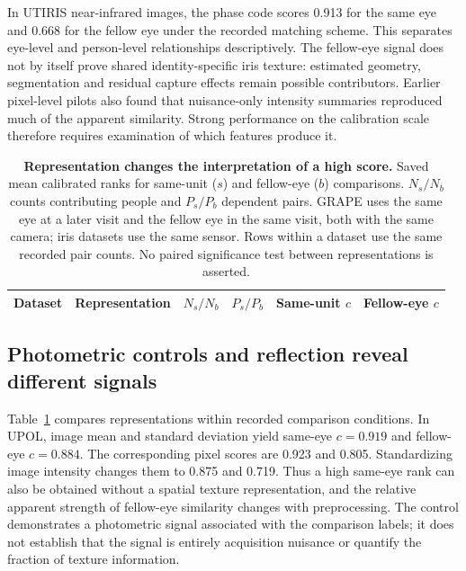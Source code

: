 \documentclass[10pt,twocolumn,letterpaper]{article}
\begin{document}
In UTIRIS near-infrared images, the phase code scores 0.913 for the same eye and 0.668 for the fellow eye under the recorded matching scheme. This separates eye-level and person-level relationships descriptively. The fellow-eye signal does not by itself prove shared identity-specific iris texture: estimated geometry, segmentation and residual capture effects remain possible contributors. Earlier pixel-level pilots also found that nuisance-only intensity summaries reproduced much of the apparent similarity. Strong performance on the calibration scale therefore requires examination of which features produce it.

\begin{table}[t]
\centering
\caption{\textbf{Representation changes the interpretation of a high score.} Saved mean calibrated ranks for same-unit ($s$) and fellow-eye ($b$) comparisons. $N_s/N_b$ counts contributing people and $P_s/P_b$ dependent pairs. GRAPE uses the same eye at a later visit and the fellow eye in the same visit, both with the same camera; iris datasets use the same sensor. Rows within a dataset use the same recorded pair counts. No paired significance test between representations is asserted.}
\label{tab:representations}
\small
\begin{tabular}{@{}llccrr@{}}
\toprule
Dataset & Representation & $N_s/N_b$ & $P_s/P_b$ & Same-unit $c$ & Fellow-eye $c$ \\
\midrule

\end{tabular}
\end{table}

\subsection{Photometric controls and reflection reveal different signals}
Table~\ref{tab:representations} compares representations within recorded comparison conditions. In UPOL, image mean and standard deviation yield same-eye $c=0.919$ and fellow-eye $c=0.884$. The corresponding pixel scores are 0.923 and 0.805. Standardizing image intensity changes them to 0.875 and 0.719. Thus a high same-eye rank can also be obtained without a spatial texture representation, and the relative apparent strength of fellow-eye similarity changes with preprocessing. The control demonstrates a photometric signal associated with the comparison labels; it does not establish that the signal is entirely acquisition nuisance or quantify the fraction of texture information.
\end{document}
